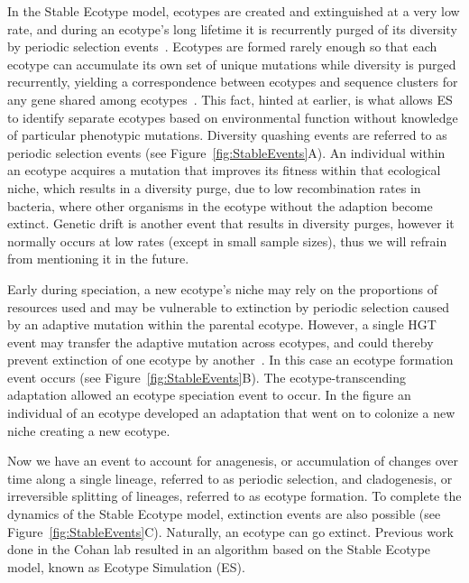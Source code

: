 In the Stable Ecotype model, ecotypes are created and extinguished at a very low rate, and during an ecotype's long lifetime it is recurrently purged of its diversity by periodic selection events~\cite{cohan2007systematics}.
Ecotypes are formed rarely enough so that each ecotype can accumulate its own set of unique mutations while diversity is purged recurrently, yielding a correspondence between ecotypes and sequence clusters for any gene shared among ecotypes~\cite{cohan2008origins}.
This fact, hinted at earlier, is what allows ES to identify separate ecotypes based on environmental function without knowledge of particular phenotypic mutations.
Diversity quashing events are referred to as periodic selection events (see Figure~\ref{fig:StableEvents}A).
An individual within an ecotype acquires a mutation that improves its fitness within that ecological niche, which results in a diversity purge, due to low recombination rates in bacteria, where other organisms in the ecotype without the adaption become extinct.
Genetic drift is another event that results in diversity purges, however it normally occurs at low rates (except in small sample sizes), thus we will refrain from mentioning it in the future.

Early during speciation, a new ecotype's niche may rely on the proportions of resources used and may be vulnerable to extinction by periodic selection caused by an adaptive mutation within the parental ecotype.
However, a single HGT event may transfer the adaptive mutation across ecotypes, and could thereby prevent extinction of one ecotype by another~\cite{cohan2008origins}.
In this case an ecotype formation event occurs (see Figure~\ref{fig:StableEvents}B).
The ecotype-transcending adaptation allowed an ecotype speciation event to occur. In the figure an individual of an ecotype developed an adaptation that went on to colonize a new niche creating a new ecotype.

Now we have an event to account for anagenesis, or accumulation of changes over time along a single lineage, referred to as periodic selection, and cladogenesis, or irreversible splitting of lineages, referred to as ecotype formation.
To complete the dynamics of the Stable Ecotype model, extinction events are also possible (see Figure~\ref{fig:StableEvents}C).
Naturally, an ecotype can go extinct.
Previous work done in the Cohan lab resulted in an algorithm based on the Stable Ecotype model, known as Ecotype Simulation (ES).


